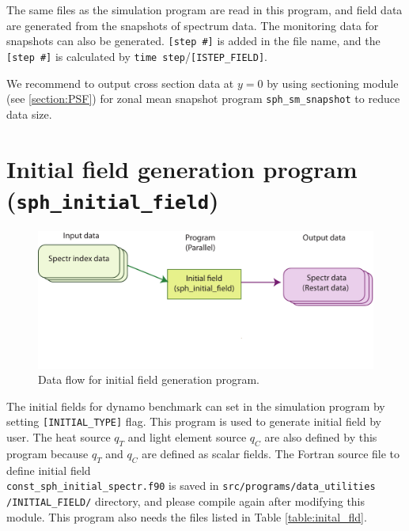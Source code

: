 The same files as the simulation program are read in this program, and field data are generated from the snapshots of spectrum data. The monitoring data for snapshots can also be generated. \verb|[step #]| is added in the file name, and the \verb|[step #]| is calculated by \verb|time step|/\verb|[ISTEP_FIELD]|.

We recommend to output cross section data at $y = 0$ by using sectioning module (see \ref{section:PSF}) for zonal mean snapshot program \verb|sph_sm_snapshot| to reduce data size.

\newpage
\section{Initial field generation program \\
({\tt sph\_initial\_field})}
\label{sec:sph_initial_field}
%
\begin{figure}[htbp]
\begin{center}
\includegraphics*[width=130mm]{images/flow_ini}
\end{center}
\caption{Data flow for initial field generation program.}
\label{fig:flow_ini}
\end{figure}
%
 The initial fields for dynamo benchmark can set in the simulation program by setting \verb|[INITIAL_TYPE]| flag. This program is used to generate initial field by user.  The heat source $q_{T}$ and light element source $q_{C}$ are also defined by this program because $q_{T}$ and $q_{C}$ are defined as scalar fields.  The Fortran source file to define initial field \\
 \verb|const_sph_initial_spectr.f90| is saved in \verb|src/programs/data_utilities| \\
 \verb|/INITIAL_FIELD/| directory,  and please compile again after modifying this module. This program also needs the files listed in Table \ref{table:inital_fld}.
%
